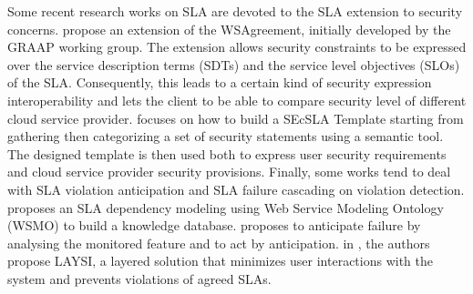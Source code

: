 
Some recent research works on SLA are devoted to the SLA extension to security concerns. 
\cite{6274042} propose an extension of the WSAgreement, initially developed by the GRAAP
working group. 
The extension allows security constraints to be expressed over the service description
terms (SDTs) and the service level objectives (SLOs) of the SLA. 
Consequently, this leads to a certain kind of security expression interoperability and lets the client to be able to compare security level of different cloud service provider. 
\cite{LunaGarcia:2012:BCS:2381913.2381932} focuses on how to build a SEcSLA Template starting from gathering then categorizing a set of security statements using a semantic tool. 
The designed template is then used both to express user security requirements and cloud service provider security provisions.
Finally, some works tend to deal with SLA violation anticipation and SLA failure cascading on violation detection.  \cite{Dastjerdi:2012:DOA:2275356.2275360}  proposes an SLA dependency modeling using Web Service Modeling Ontology (WSMO) to build a knowledge database. \cite{5614035} proposes to anticipate failure by analysing the monitored feature and to act by anticipation. in
\cite{5614035}, the authors propose LAYSI, a layered solution that minimizes user interactions with the system and prevents violations of agreed SLAs.



